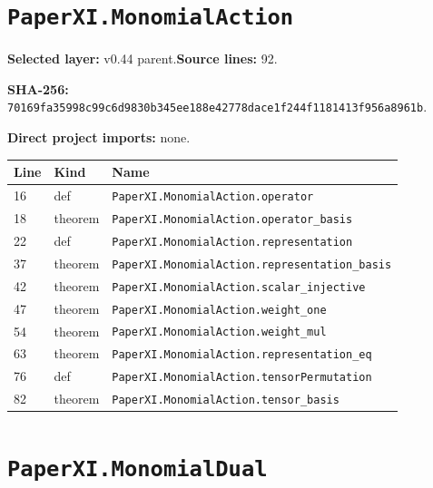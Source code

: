 \documentclass[10pt,oneside]{book}
\begin{document}
\section{\texorpdfstring{\nolinkurl{PaperXI.MonomialAction}}{PaperXI.MonomialAction}}\label{module:PaperXI.MonomialAction}

\textbf{Selected layer:} v0.44 parent.\quad\textbf{Source lines:} 92.\par\textbf{SHA-256:} {\scriptsize\nolinkurl{70169fa35998c99c6d9830b345ee188e42778dace1f244f1181413f956a8961b}}.


\textbf{Direct project imports:} none.

\begin{longtable}{@{}p{}p{}p{}@{}}\toprule Line&Kind&Name\\\midrule\endhead

16&def&\nolinkurl{PaperXI.MonomialAction.operator}\\

18&theorem&\nolinkurl{PaperXI.MonomialAction.operator_basis}\\

22&def&\nolinkurl{PaperXI.MonomialAction.representation}\\

37&theorem&\nolinkurl{PaperXI.MonomialAction.representation_basis}\\

42&theorem&\nolinkurl{PaperXI.MonomialAction.scalar_injective}\\

47&theorem&\nolinkurl{PaperXI.MonomialAction.weight_one}\\

54&theorem&\nolinkurl{PaperXI.MonomialAction.weight_mul}\\

63&theorem&\nolinkurl{PaperXI.MonomialAction.representation_eq}\\

76&def&\nolinkurl{PaperXI.MonomialAction.tensorPermutation}\\

82&theorem&\nolinkurl{PaperXI.MonomialAction.tensor_basis}\\

\bottomrule\end{longtable}

\section{\texorpdfstring{\nolinkurl{PaperXI.MonomialDual}}{PaperXI.MonomialDual}}\label{module:PaperXI.MonomialDual}
\end{document}
